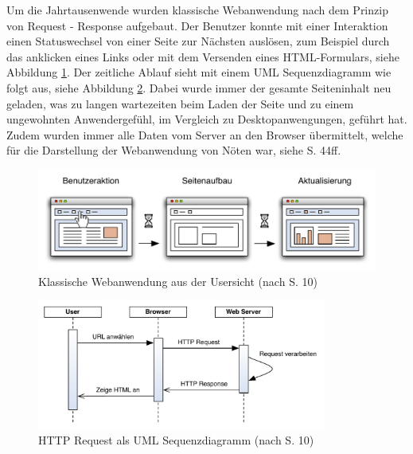   Um die Jahrtausenwende wurden klassische Webanwendung nach dem Prinzip von
  Request - Response aufgebaut. Der Benutzer konnte mit einer Interaktion einen
  Statuswechsel von einer Seite zur Nächsten auslösen, zum Beispiel durch das
  anklicken eines Links oder mit dem Versenden eines HTML-Formulars, siehe
  Abbildung \ref{img:classicPageReload}. Der zeitliche Ablauf sieht mit einem
  \ac{UML} Sequenzdiagramm wie folgt aus, siehe Abbildung
  \ref{img:sequenzdiagrammClassicPageReload}. Dabei wurde immer der gesamte
  Seiteninhalt neu geladen, was zu langen wartezeiten beim Laden der Seite und
  zu einem ungewohnten Anwendergefühl, im Vergleich zu Desktopanwengungen,
  geführt hat. Zudem wurden immer alle Daten vom Server an den Browser
  übermittelt, welche für die Darstellung der Webanwendung von Nöten war, siehe
  \cite{AjaxInAction} S. 44ff.
  
  \begin{figure}[hbt]
    \begin{center}
      \includegraphics[width=\textwidth]{./image/classicPageReload.pdf}
      \caption{Klassische Webanwendung aus der Usersicht (nach
      \cite{DiplomarbeitStephanSchuster} S. 10)}
      \label{img:classicPageReload}
    \end{center}
  \end{figure}
  
  \begin{figure}[hbt]
    \begin{center}
      \includegraphics[width=0.85\textwidth]{./image/sequenzdiagrammClassicPageReload.pdf}
      \caption{HTTP Request als \ac{UML} Sequenzdiagramm (nach
      \cite{HttpBasics} S. 10)}
      \label{img:sequenzdiagrammClassicPageReload}
    \end{center}
  \end{figure}
  
